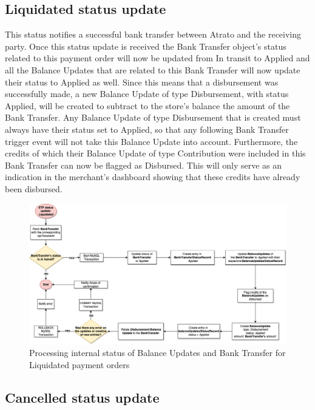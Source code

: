 \subsection{Liquidated status update}

This status notifies a successful bank transfer between Atrato and the receiving party. Once this status update is received the Bank Transfer object’s status related to this payment order will now be updated from In transit to Applied and all the Balance Updates that are related to this Bank Transfer will now update their status to Applied as well. Since this means that a disbursement was successfully made, a new Balance Update of type Disbursement, with status Applied, will be created to subtract to the store’s balance the amount of the Bank Transfer. Any Balance Update of type Disbursement that is created must always have their status set to Applied, so that any following Bank Transfer trigger event will not take this Balance Update into account.
Furthermore, the credits of which their Balance Update of type Contribution were included in this Bank Transfer can now be flagged as Disbursed. This will only serve as an indication in the merchant’s dashboard showing that these credits have already been disbursed.

\begin{figure} [h]
    \centering
    \includegraphics[scale = 0.4]{assets/diagrams/LiquidatedStatusUpdate.png}
    \caption{Processing internal status of Balance Updates and Bank Transfer for Liquidated payment orders}\label{fig:liquidated_status_update}
\end{figure}

\subsection{Cancelled status update}

